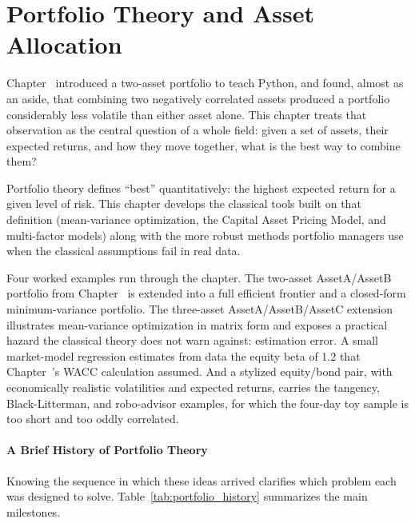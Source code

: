 \documentclass[../ai_in_finance]{subfiles}
\begin{document}
\chapter{Portfolio Theory and Asset Allocation}

Chapter~ introduced a two-asset portfolio to teach Python, and found, almost as an aside, that combining two negatively correlated assets produced a portfolio considerably less volatile than either asset alone. This chapter treats that observation as the central question of a whole field: given a set of assets, their expected returns, and how they move together, what is the best way to combine them?

Portfolio theory defines ``best'' quantitatively: the highest expected return for a given level of risk. This chapter develops the classical tools built on that definition (mean-variance optimization, the Capital Asset Pricing Model, and multi-factor models) along with the more robust methods portfolio managers use when the classical assumptions fail in real data.

Four worked examples run through the chapter. The two-asset AssetA/AssetB portfolio from Chapter~ is extended into a full efficient frontier and a closed-form minimum-variance portfolio. The three-asset AssetA/AssetB/AssetC extension illustrates mean-variance optimization in matrix form and exposes a practical hazard the classical theory does not warn against: estimation error. A small market-model regression estimates from data the equity beta of 1.2 that Chapter~'s WACC calculation assumed. And a stylized equity/bond pair, with economically realistic volatilities and expected returns, carries the tangency, Black-Litterman, and robo-advisor examples, for which the four-day toy sample is too short and too oddly correlated.

\subsubsection*{A Brief History of Portfolio Theory}

Knowing the sequence in which these ideas arrived clarifies which problem each was designed to solve. Table~\ref{tab:portfolio_history} summarizes the main milestones.
\end{document}
